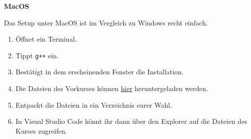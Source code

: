 \textbf{MacOS}

\pagestyle{empty}

Das Setup unter MacOS ist im Vergleich zu Windows recht einfach.

\begin{enumerate}
	\item Öffnet ein Terminal.
	\item Tippt \texttt{g++} ein.
	\item Bestätigt in dem erscheinenden Fenster die Installation.
	\item Die Dateien des Vorkurses können \href{https://mathphys.info/vorkurs/pvk/vorkurs.zip}{hier} heruntergeladen werden.
	\item Entpackt die Dateien in ein Verzeichnis eurer Wahl.
	\item In Visual Studio Code könnt ihr dann über den Explorer auf die Dateien des Kurses zugreifen.
\end{enumerate}